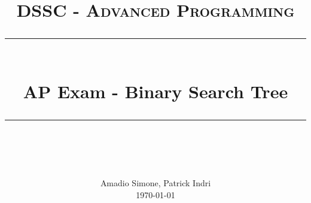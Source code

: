 \newcommand{\horrule}[1]{\rule{\linewidth}{#1}} 	%


\title{
	\normalfont \normalsize \textsc{DSSC - Advanced Programming} \\ [25pt]
	\horrule{0.5pt} \\[0.4cm]
	\huge AP Exam - Binary Search Tree \\
	\horrule{2pt} \\[0.5cm]
}
\author{
	\normalfont 								\normalsize
	Amadio Simone, Patrick Indri\\[-3pt]		\normalsize
    \today
}
\date{}

